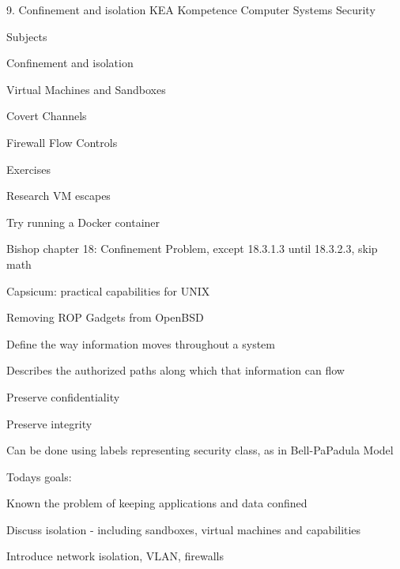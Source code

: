 \documentclass[Screen16to9,17pt]{foils}
\begin{document}
\mytitlepage
{9. Confinement and isolation}
{KEA Kompetence Computer Systems Security}



\begin{list1}
\item Subjects
\begin{list2}
\item Confinement and isolation
\item Virtual Machines and Sandboxes
\item Covert Channels
\item Firewall Flow Controls
\end{list2}
\item Exercises
\begin{list2}
\item Research VM escapes
\item Try running a Docker container
\end{list2}
\end{list1}




\begin{list1}
\item Bishop chapter 18: Confinement Problem, except 18.3.1.3 until 18.3.2.3, skip math
\item Capsicum: practical capabilities for UNIX
\item Removing ROP Gadgets from OpenBSD
\end{list1}


\begin{list1}
\item Define the way information moves throughout a system
\item Describes the authorized paths along which that information can flow
\begin{list2}
\item Preserve confidentiality
\item Preserve integrity
\end{list2}
\item Can be done using labels representing security class, as in Bell-PaPadula Model
\end{list1}



Todays goals:
\begin{list2}
\item Known the problem of keeping applications and data confined
\item Discuss isolation - including sandboxes, virtual machines and capabilities
\item Introduce network isolation, VLAN, firewalls
\end{list2}
\end{document}
